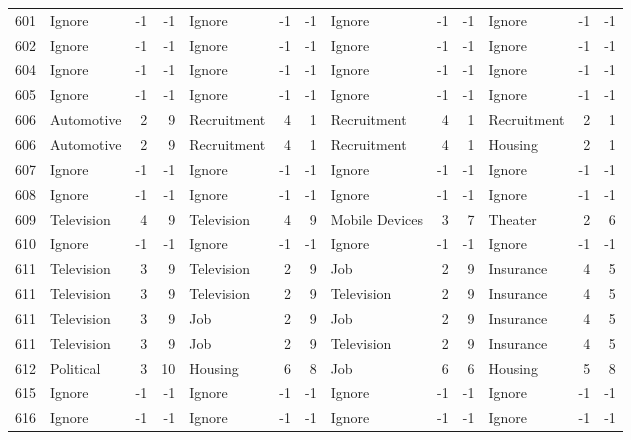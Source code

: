 \begin{figure}[htbp]
\begin{tabular}{rlrrlrrlrrlrr}
    601   & Ignore & -1    & -1    & Ignore & -1    & -1    & Ignore & -1    & -1    & Ignore & -1    & -1 \\
    602   & Ignore & -1    & -1    & Ignore & -1    & -1    & Ignore & -1    & -1    & Ignore & -1    & -1 \\
    604   & Ignore & -1    & -1    & Ignore & -1    & -1    & Ignore & -1    & -1    & Ignore & -1    & -1 \\
    605   & Ignore & -1    & -1    & Ignore & -1    & -1    & Ignore & -1    & -1    & Ignore & -1    & -1 \\
    606   & Automotive & 2     & 9     & Recruitment & 4     & 1     & Recruitment & 4     & 1     & Recruitment & 2     & 1 \\
    606   & Automotive & 2     & 9     & Recruitment & 4     & 1     & Recruitment & 4     & 1     & Housing & 2     & 1 \\
    607   & Ignore & -1    & -1    & Ignore & -1    & -1    & Ignore & -1    & -1    & Ignore & -1    & -1 \\
    608   & Ignore & -1    & -1    & Ignore & -1    & -1    & Ignore & -1    & -1    & Ignore & -1    & -1 \\
    609   & Television & 4     & 9     & Television & 4     & 9     & Mobile Devices & 3     & 7     & Theater & 2     & 6 \\
    610   & Ignore & -1    & -1    & Ignore & -1    & -1    & Ignore & -1    & -1    & Ignore & -1    & -1 \\
    611   & Television & 3     & 9     & Television & 2     & 9     & Job   & 2     & 9     & Insurance & 4     & 5 \\
    611   & Television & 3     & 9     & Television & 2     & 9     & Television & 2     & 9     & Insurance & 4     & 5 \\
    611   & Television & 3     & 9     & Job   & 2     & 9     & Job   & 2     & 9     & Insurance & 4     & 5 \\
    611   & Television & 3     & 9     & Job   & 2     & 9     & Television & 2     & 9     & Insurance & 4     & 5 \\
    612   & Political & 3     & 10    & Housing & 6     & 8     & Job   & 6     & 6     & Housing & 5     & 8 \\
    615   & Ignore & -1    & -1    & Ignore & -1    & -1    & Ignore & -1    & -1    & Ignore & -1    & -1 \\
    616   & Ignore & -1    & -1    & Ignore & -1    & -1    & Ignore & -1    & -1    & Ignore & -1    & -1 \\

\end{tabular}
\end{figure}
